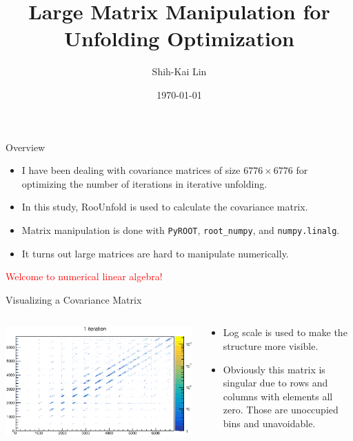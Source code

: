 \documentclass[aspectratio=169]{beamer}
\title{Large Matrix Manipulation for Unfolding Optimization}
\date[today]{\today}
\author{Shih-Kai Lin}
\institute{Colorado State University}
\begin{document}
\begin{frame}
\titlepage
\end{frame}



\begin{frame}{Overview}
  \begin{itemize}
    \item I have been dealing with covariance matrices of size $6776\times 6776$ for optimizing the number of iterations in iterative unfolding.
    \item In this study, RooUnfold is used to calculate the covariance matrix.
    \item Matrix manipulation is done with \texttt{PyROOT}, \texttt{root\_numpy}, and \texttt{numpy.linalg}.
    \item It turns out large matrices are hard to manipulate numerically.
  \end{itemize}
  \bigskip
  \centering
  \textcolor{red}{Welcome to numerical linear algebra!}
\end{frame}

\begin{frame}{Visualizing a Covariance Matrix}
\begin{columns}
  \begin{column}{.6\textwidth}
    \includegraphics[width=\textwidth]{figures/cov_mat.eps}
  \end{column}
  \begin{column}{.4\textwidth}
    \begin{itemize}
      \item Log scale is used to make the structure more visible.
      \item Obviously this matrix is singular due to rows and columns with elements all zero. Those are unoccupied bins and unavoidable.
    \end{itemize}
  \end{column}
\end{columns}
\end{frame}
\end{document}
